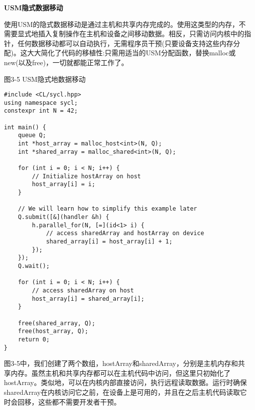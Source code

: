 \hspace*{\fill} \par %
\textbf{USM隐式数据移动}

使用USM的隐式数据移动是通过主机和共享内存完成的。使用这类型的内存，不需要显式地插入复制操作在主机和设备之间移动数据。相反，只需访问内核中的指针，任何数据移动都可以自动执行，无需程序员干预(只要设备支持这些内存分配)。这大大简化了代码的移植性:只需用适当的USM分配函数，替换malloc或new(以及free)，一切就都能正常工作了。\par

\hspace*{\fill} \par %
图3-5 USM隐式地数据移动
\begin{lstlisting}[caption={}]
#include <CL/sycl.hpp>
using namespace sycl;
constexpr int N = 42;

int main() {
	queue Q;
	int *host_array = malloc_host<int>(N, Q);
	int *shared_array = malloc_shared<int>(N, Q);
	
	for (int i = 0; i < N; i++) {
		// Initialize hostArray on host
		host_array[i] = i;
	}

	// We will learn how to simplify this example later
	Q.submit([&](handler &h) {
		h.parallel_for(N, [=](id<1> i) {
			// access sharedArray and hostArray on device
			shared_array[i] = host_array[i] + 1;
		});
	});
	Q.wait();
	
	for (int i = 0; i < N; i++) {
		// access sharedArray on host
		host_array[i] = shared_array[i];
	}

	free(shared_array, Q);
	free(host_array, Q);
	return 0;
}
\end{lstlisting}

图3-5中，我们创建了两个数组，hostArray和sharedArray，分别是主机内存和共享内存。虽然主机和共享内存都可以在主机代码中访问，但这里只初始化了hostArray。类似地，可以在内核内部直接访问，执行远程读取数据。运行时确保sharedArray在内核访问它之前，在设备上是可用的，并且在之后主机代码读取它时会回移，这些都不需要开发者干预。\par




















